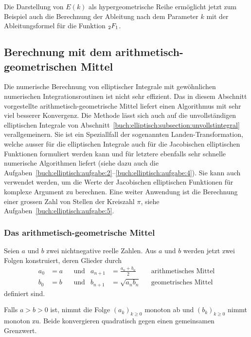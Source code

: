 Die Darstellung von $E(k)$ als hypergeometrische Reihe ermöglicht
jetzt zum Beispiel auch die Berechnung der Ableitung nach dem
Parameter $k$ mit der Ableitungsformel für die Funktion $\mathstrut_2F_1$.


%
%
\subsection{Berechnung mit dem arithmetisch-geometrischen Mittel
\label{buch:elliptisch:subsection:agm}}
Die numerische Berechnung von elliptischer Integrale mit gewöhnlichen
numerischen Integrationsroutinen ist nicht sehr effizient.
Das in diesem Abschnitt vorgestellte arithmetisch-geometrische Mittel
%
liefert einen Algorithmus mit sehr viel besserer Konvergenz.
Die Methode lässt sich auch auf die unvollständigen elliptischen
Integrale von Abschnitt~\eqref{buch:elliptisch:subsection:unvollstintegral}
verallgemeinern.
Sie ist ein Speziallfall der sogenannten Landen-Transformation,
%
welche ausser für die elliptischen Integrale auch für die 
Jacobischen elliptischen Funktionen formuliert werden kann und
für letztere ebenfalls sehr schnelle numerische Algorithmen liefert
(siehe dazu auch die
Aufgaben~\ref{buch:elliptisch:aufgabe:2}--\ref{buch:elliptisch:aufgabe:4}).
Sie kann auch verwendet werden, um die Werte der Jacobischen elliptischen
Funktionen für komplexe Argument zu berechnen.
Eine weiter Anwendung ist die Berechnung einer grossen Zahl von 
Stellen der Kreiszahl $\pi$, siehe Aufgaben~\ref{buch:elliptisch:aufgabe:5}.

%
%
\subsubsection{Das arithmetisch-geometrische Mittel}
Seien $a$ und $b$ zwei nichtnegative reelle Zahlen.
Aus $a$ und $b$ werden jetzt zwei Folgen konstruiert, deren Glieder
durch
\begin{align*}
a_0&=a &&\text{und}& a_{n+1} &= \frac{a_n+b_n}2 &&\text{arithmetisches Mittel}
\\
b_0&=b &&\text{und}& b_{n+1} &= \sqrt{a_nb_n}   &&\text{geometrisches Mittel}
\end{align*}
definiert sind.

\begin{satz}
Falls $a>b>0$ ist, nimmt die Folge $(a_k)_{k\ge 0}$ monoton ab und
$(b_k)_{k\ge 0}$ nimmt monoton zu.
Beide konvergieren quadratisch gegen einen gemeinsamen Grenzwert.
\end{satz}

